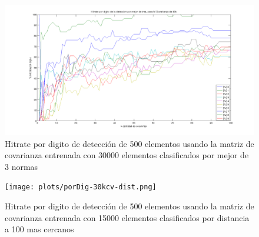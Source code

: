 \begin{figure}[H]
\begin {center}
\includegraphics[width=500pt]{plots/porDig-30kcv-bo3.png}
\end {center}
\caption{Hitrate por digito de detecci\'on de 500 elementos usando la matriz de covarianza entrenada con 30000 elementos
clasificados por mejor de 3 normas}
\label{fig:HRD30kcv-bo3}
\end{figure}

\begin{figure}[H]
\begin {center}
\texttt{[image: plots/porDig-30kcv-dist.png]}
\end {center}
\caption{Hitrate por digito de detecci\'on de 500 elementos usando la matriz de covarianza entrenada con 15000 elementos
clasificados por distancia a 100 mas cercanos}
\label{fig:HRD30kcv-dist100}
\end{figure}